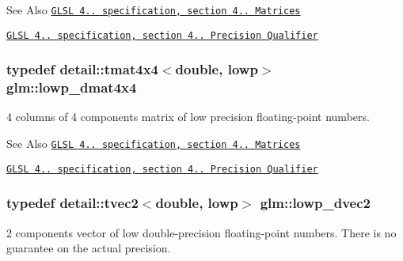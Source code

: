 \begin{DoxySeeAlso}{See Also}
\href{http://www.opengl.org/registry/doc/GLSLangSpec.4.20.8.pdf}{\tt G\-L\-S\-L 4.. specification, section 4.. Matrices} 

\href{http://www.opengl.org/registry/doc/GLSLangSpec.4.20.8.pdf}{\tt G\-L\-S\-L 4.. specification, section 4.. Precision Qualifier} 
\end{DoxySeeAlso}
\hypertarget{group__core__precision_gac762dec40f53114dfe6894499a2c9a79}{
\subsubsection[{lowp\-\_\-dmat4x4}]{\setlength{\rightskip}{0pt plus 5cm}typedef detail\-::tmat4x4$<$double, lowp$>$ {\bf glm\-::lowp\-\_\-dmat4x4}}}\label{group__core__precision_gac762dec40f53114dfe6894499a2c9a79}
4 columns of 4 components matrix of low precision floating-\/point numbers.

\begin{DoxySeeAlso}{See Also}
\href{http://www.opengl.org/registry/doc/GLSLangSpec.4.20.8.pdf}{\tt G\-L\-S\-L 4.. specification, section 4.. Matrices} 

\href{http://www.opengl.org/registry/doc/GLSLangSpec.4.20.8.pdf}{\tt G\-L\-S\-L 4.. specification, section 4.. Precision Qualifier} 
\end{DoxySeeAlso}
\hypertarget{group__core__precision_ga27a115a27d5f065e8c043f57191d583b}{
\subsubsection[{lowp\-\_\-dvec2}]{\setlength{\rightskip}{0pt plus 5cm}typedef detail\-::tvec2$<$double, lowp$>$ {\bf glm\-::lowp\-\_\-dvec2}}}\label{group__core__precision_ga27a115a27d5f065e8c043f57191d583b}
2 components vector of low double-\/precision floating-\/point numbers. There is no guarantee on the actual precision.

